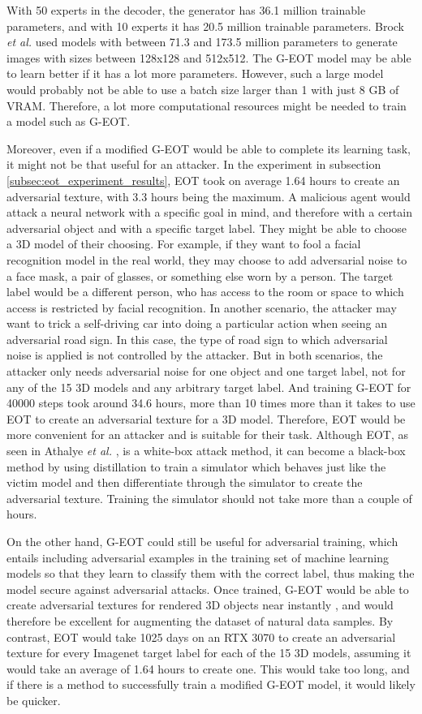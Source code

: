 With 50 experts in the decoder, the generator has 36.1 million trainable parameters, and with 10 experts it has 20.5 million trainable parameters. Brock \textit{et al.} \cite{big_gan} used models with between 71.3 and 173.5 million parameters to generate images with sizes between 128x128 and 512x512. The G-EOT model may be able to learn better if it has a lot more parameters. However, such a large model would probably not be able to use a batch size larger than 1 with just 8 GB of VRAM. Therefore, a lot more computational resources might be needed to train a model such as G-EOT.

Moreover, even if a modified G-EOT would be able to complete its learning task, it might not be that useful for an attacker. In the experiment in subsection \ref{subsec:eot_experiment_results}, EOT took on average 1.64 hours to create an adversarial texture, with 3.3 hours being the maximum. A malicious agent would attack a neural network with a specific goal in mind, and therefore with a certain adversarial object and with a specific target label. They might be able to choose a 3D model of their choosing. For example, if they want to fool a facial recognition model in the real world, they may choose to add adversarial noise to a face mask, a pair of glasses, or something else worn by a person. The target label would be a different person, who has access to the room or space to which access is restricted by facial recognition. In another scenario, the attacker may want to trick a self-driving car into doing a particular action when seeing an adversarial road sign. In this case, the type of road sign to which adversarial noise is applied is not controlled by the attacker. But in both scenarios, the attacker only needs adversarial noise for one object and one target label, not for any of the 15 3D models and any arbitrary target label. And training G-EOT for 40000 steps took around 34.6 hours, more than 10 times more than it takes to use EOT to create an adversarial texture for a 3D model. Therefore, EOT would be more convenient for an attacker and is suitable for their task. Although EOT, as seen in Athalye \textit{et al.} \cite{athalye}, is a white-box attack method, it can become a black-box method by using distillation \cite{distillation} to train a simulator which behaves just like the victim model and then differentiate through the simulator to create the adversarial texture. Training the simulator should not take more than a couple of hours.

On the other hand, G-EOT could still be useful for adversarial training, which entails including adversarial examples in the training set of machine learning models so that they learn to classify them with the correct label, thus making the model secure against adversarial attacks. Once trained, G-EOT would be able to create adversarial textures for rendered 3D objects near instantly \cite{advGAN}, and would therefore be excellent for augmenting the dataset of natural data samples. By contrast, EOT would take 1025 days on an RTX 3070 to create an adversarial texture for every Imagenet target label for each of the 15 3D models, assuming it would take an average of 1.64 hours to create one. This would take too long, and if there is a method to successfully train a modified G-EOT model, it would likely be quicker.
